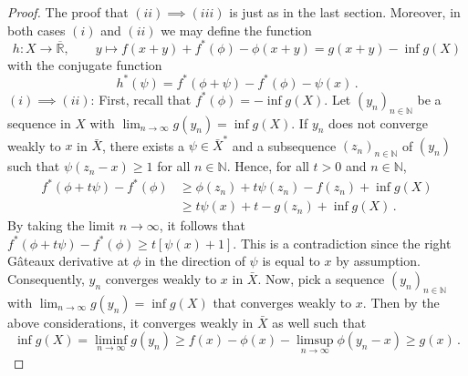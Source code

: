 \documentclass[
	paper=A4,
	pagesize=auto,
	fontsize=12pt
]{scrartcl}
\theoremstyle{plain}
\theoremstyle{remark}
\theoremstyle{definition}
\begin{document}
\begin{proof}
The proof that $(ii) \implies (iii)$ is just as in the last section.
Moreover, in both cases $(i)$ and $(ii)$ we may define the function
%
\begin{equation}
h : X \to \overline{\mathbb{R}}, \qquad y \mapsto
f \left( x + y \right) + f^* \left( \phi \right) - \phi \left( x + y \right)
=
g \left( x + y \right) - \inf g \left( X \right)
\end{equation}
%
with the conjugate function
%
\begin{equation}
h^*(\psi)
=
f^* \left( \phi + \psi \right) - f^* \left( \phi \right) - \psi \left( x \right) \, .
\end{equation}
%
$(i) \implies (ii)$:
First, recall that $f^*(\phi) = - \inf g(X)$.
Let $(y_n)_{n \in \mathbb{N}}$ be a sequence in $X$ with $\lim_{n \to \infty} g(y_n) = \inf g(X)$.
If $y_n$ does not converge weakly to $x$ in $\bar{X}$, there exists a $\psi \in \bar{X}^*$ and a subsequence $(z_n)_{n \in \mathbb{N}}$ of $(y_n)$ such that $\psi(z_n - x) \ge 1$ for all $n \in \mathbb{N}$.
Hence, for all $t > 0$ and $n \in \mathbb{N}$,
%
\begin{equation}
\begin{aligned}
f^* \left( \phi +t \psi \right) - f^* \left( \phi \right) 
&\ge
\phi \left( z_n \right) + t \psi \left( z_n \right) - f \left( z_n \right) + \inf g \left( X \right) \\
&\ge
t \psi \left( x \right) + t - g \left( z_n \right) + \inf g \left( X \right) \, .
\end{aligned}
\end{equation}
%
By taking the limit $n \to \infty$, it follows that $f^*(\phi+t\psi) -f^*(\phi)\geq t [ \psi(x) + 1 ]$.
This is a contradiction since the right Gâteaux derivative at $\phi$ in the direction of $\psi$ is equal to $x$ by assumption.
Consequently, $y_n$ converges weakly to $x$ in $\bar{X}$.
Now, pick a sequence $(y_n)_{n \in \mathbb{N}}$ with $\lim_{n \to \infty} g (y_n ) = \inf g(X)$ that converges weakly to $x$.
Then by the above considerations, it converges weakly in $\bar{X}$ as well such that
%
\begin{equation}
\inf g \left( X \right)
=
\liminf_{n \to \infty} g \left( y_n \right)
\ge
f \left( x \right)
- \phi \left( x \right)
- \limsup_{n \to \infty} \phi \left( y_n - x \right)
\ge
g \left( x \right) \, .
\end{equation}


\end{proof}
\end{document}
